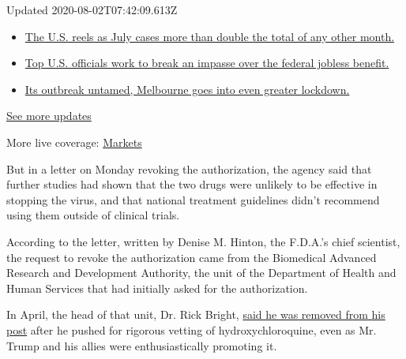 Updated 2020-08-02T07:42:09.613Z

\begin{itemize}
\tightlist
\item
  \href{https://www.nytimes3xbfgragh.onion/2020/08/01/world/coronavirus-covid-19.html?action=click\&pgtype=Article\&state=default\&region=MAIN_CONTENT_1\&context=storylines_live_updates\#link-34047410}{The
  U.S. reels as July cases more than double the total of any other
  month.}
\item
  \href{https://www.nytimes3xbfgragh.onion/2020/08/01/world/coronavirus-covid-19.html?action=click\&pgtype=Article\&state=default\&region=MAIN_CONTENT_1\&context=storylines_live_updates\#link-780ec966}{Top
  U.S. officials work to break an impasse over the federal jobless
  benefit.}
\item
  \href{https://www.nytimes3xbfgragh.onion/2020/08/01/world/coronavirus-covid-19.html?action=click\&pgtype=Article\&state=default\&region=MAIN_CONTENT_1\&context=storylines_live_updates\#link-2bc8948}{Its
  outbreak untamed, Melbourne goes into even greater lockdown.}
\end{itemize}

\href{https://www.nytimes3xbfgragh.onion/2020/08/01/world/coronavirus-covid-19.html?action=click\&pgtype=Article\&state=default\&region=MAIN_CONTENT_1\&context=storylines_live_updates}{See
more updates}

More live coverage:
\href{https://www.nytimes3xbfgragh.onion/live/2020/07/31/business/stock-market-today-coronavirus?action=click\&pgtype=Article\&state=default\&region=MAIN_CONTENT_1\&context=storylines_live_updates}{Markets}

But in a letter on Monday revoking the authorization, the agency said
that further studies had shown that the two drugs were unlikely to be
effective in stopping the virus, and that national treatment guidelines
didn't recommend using them outside of clinical trials.

According to the letter, written by Denise M. Hinton, the F.D.A.'s chief
scientist, the request to revoke the authorization came from the
Biomedical Advanced Research and Development Authority, the unit of the
Department of Health and Human Services that had initially asked for the
authorization.

In April, the head of that unit, Dr. Rick Bright,
\href{https://www.nytimes3xbfgragh.onion/2020/04/22/us/politics/rick-bright-trump-hydroxychloroquine-coronavirus.html}{said
he was removed from his post} after he pushed for rigorous vetting of
hydroxychloroquine, even as Mr. Trump and his allies were
enthusiastically promoting it.

